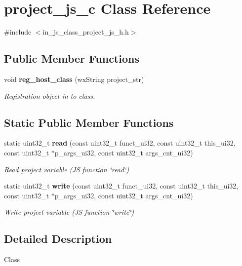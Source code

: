\section{project\+\_\+js\+\_\+c Class Reference}
\label{classproject__js__c}


{\ttfamily \#include $<$in\+\_\+js\+\_\+class\+\_\+project\+\_\+js\+\_\+h.\+h$>$}

\subsection*{Public Member Functions}
\begin{DoxyCompactItemize}
\item 
void \textbf{ reg\+\_\+host\+\_\+class} (wx\+String project\+\_\+str)
\begin{DoxyCompactList}\small\item\em Registration object in to class. \end{DoxyCompactList}\end{DoxyCompactItemize}
\subsection*{Static Public Member Functions}
\begin{DoxyCompactItemize}
\item 
static uint32\+\_\+t \textbf{ read} (const uint32\+\_\+t funct\+\_\+ui32, const uint32\+\_\+t this\+\_\+ui32, const uint32\+\_\+t $\ast$p\+\_\+args\+\_\+ui32, const uint32\+\_\+t args\+\_\+cnt\+\_\+ui32)
\begin{DoxyCompactList}\small\item\em Read project variable (JS function \char`\"{}read\char`\"{}) \end{DoxyCompactList}\item 
static uint32\+\_\+t \textbf{ write} (const uint32\+\_\+t funct\+\_\+ui32, const uint32\+\_\+t this\+\_\+ui32, const uint32\+\_\+t $\ast$p\+\_\+args\+\_\+ui32, const uint32\+\_\+t args\+\_\+cnt\+\_\+ui32)
\begin{DoxyCompactList}\small\item\em Write project variable (JS function \char`\"{}write\char`\"{}) \end{DoxyCompactList}\end{DoxyCompactItemize}


\subsection{Detailed Description}
Class 

